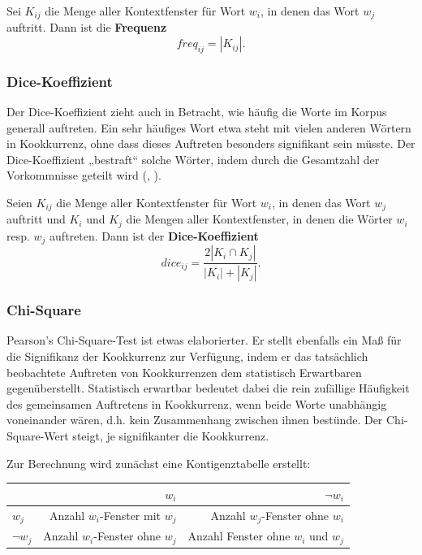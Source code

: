 \documentclass[11pt,numbers=noenddot]{scrartcl}
\begin{document}
Sei $K_{ij}$ die Menge aller Kontextfenster für Wort $w_i$, in denen das Wort $w_j$ auftritt. Dann ist die \textbf{Frequenz}
\begin{equation*}
   freq_{ij} = |K_{ij}|.
\end{equation*}

\subsubsection{Dice-Koeffizient} \label{dice}

Der Dice-Koeffizient zieht auch in Betracht, wie häufig die Worte im Korpus generall auftreten. Ein sehr häufiges Wort etwa steht mit vielen anderen Wörtern in Kookkurrenz, ohne dass dieses Auftreten besonders signifikant sein müsste. Der Dice-Koeffizient „bestraft“ solche Wörter, indem durch die Gesamtzahl der Vorkommnisse geteilt wird (\citet[S.299]{manning1999}, \citet[S. 213]{heyer2008}).

Seien $K_{ij}$ die Menge aller Kontextfenster für Wort $w_i$, in denen das Wort $w_j$ auftritt und $K_{i}$ und $K_{j}$ die Mengen aller Kontextfenster, in denen die Wörter $w_i$ resp. $w_j$ auftreten. Dann ist der \textbf{Dice-Koeffizient}
\begin{equation*}
   dice_{ij} = \frac{2 |K_{i} \cap K_{j}| }{|K_{i}| + |K_{j}|}.
\end{equation*}

\subsubsection{Chi-Square} \label{chi}

Pearson's Chi-Square-Test ist etwas elaborierter. Er stellt ebenfalls ein Maß für die Signifikanz der Kookkurrenz zur Verfügung, indem er das tatsächlich beobachtete Auftreten von Kookkurrenzen dem statistisch Erwartbaren gegenüberstellt. Statistisch erwartbar bedeutet dabei die rein zufällige Häufigkeit des gemeinsamen Auftretens in Kookkurrenz, wenn beide Worte unabhängig voneinander wären, d.h. kein Zusammenhang zwischen ihnen bestünde. Der Chi-Square-Wert steigt, je signifikanter die Kookkurrenz.

Zur Berechnung wird zunächst eine Kontigenztabelle erstellt:
\begin{table}[h]
    \begin{center}
        \begin{tabular}{l|r|r}
                    & $w_i$ & $\neg w_i$ \\ \hline
            $w_j$ &  Anzahl $w_i$-Fenster mit $w_j$ & Anzahl $w_j$-Fenster ohne $w_i$\\ \hline
            $\neg w_j$ &  Anzahl $w_i$-Fenster ohne $w_j$ & Anzahl Fenster ohne $w_i$ und $w_j$
        \end{tabular}
    \end{center}
\end{table}
\end{document}
